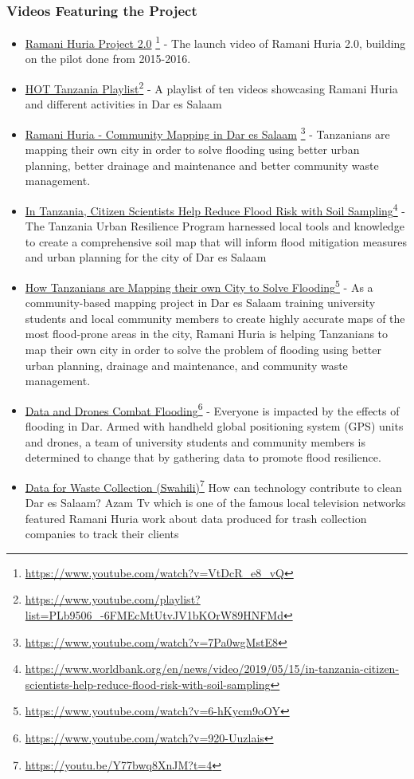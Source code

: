 \documentclass[a4paper,12pt,twoside]{article}
\begin{document}
\subsubsection{Videos Featuring the Project}
\bigskip
\begin{itemize}
    \item \href{https://www.youtube.com/watch?v=VtDcR_e8_vQ}{Ramani Huria Project 2.0} \footnote{\url{https://www.youtube.com/watch?v=VtDcR_e8_vQ}}
- The launch video of Ramani Huria 2.0, building on the pilot done from 2015-2016.
    \item \href{https://www.youtube.com/playlist?list=PLb9506_-6FMEcMtUtvJV1bKOrW89HNFMd}{HOT Tanzania Playlist}\footnote{\url{https://www.youtube.com/playlist?list=PLb9506_-6FMEcMtUtvJV1bKOrW89HNFMd}}
- A playlist of ten videos showcasing Ramani Huria and different activities in Dar es Salaam
    \item \href{https://www.youtube.com/watch?v=7Pa0wgMstE8}{Ramani Huria - Community Mapping in Dar es Salaam} \footnote{\url{https://www.youtube.com/watch?v=7Pa0wgMstE8}} - Tanzanians are mapping their own city in order to solve flooding using better urban planning, better drainage and maintenance and better community waste management.
    \item \href{https://www.worldbank.org/en/news/video/2019/05/15/in-tanzania-citizen-scientists-help-reduce-flood-risk-with-soil-sampling}{In Tanzania, Citizen Scientists Help Reduce Flood Risk with Soil Sampling}\footnote{\url{https://www.worldbank.org/en/news/video/2019/05/15/in-tanzania-citizen-scientists-help-reduce-flood-risk-with-soil-sampling}}
- The Tanzania Urban Resilience Program harnessed local tools and knowledge to create a comprehensive soil map that will inform flood mitigation measures and urban planning for the city of Dar es Salaam
    \item \href{https://www.youtube.com/watch?v=6-hKycm9oOY}{How Tanzanians are Mapping their own City to Solve Flooding}\footnote{\url{https://www.youtube.com/watch?v=6-hKycm9oOY}}
- As a community-based mapping project in Dar es Salaam training university students and local community members to create highly accurate maps of the most flood-prone areas in the city, Ramani Huria is helping Tanzanians to map their own city in order to solve the problem of flooding using better urban planning, drainage and maintenance, and community waste management.
    \item \href{https://www.youtube.com/watch?v=920-Uuzlais}{Data and Drones Combat Flooding}\footnote{\url{https://www.youtube.com/watch?v=920-Uuzlais}}
- Everyone is impacted by the effects of flooding in Dar. Armed with handheld global positioning system (GPS) units and drones, a team of university students and community members is determined to change that by gathering data to promote flood resilience.
    \item \href{https://youtu.be/Y77bwq8XnJM?t=4}{ Data for Waste Collection (Swahili)}\footnote{\url{https://youtu.be/Y77bwq8XnJM?t=4}}
How can technology contribute to clean Dar es Salaam? Azam Tv which is one of the famous local television networks featured Ramani Huria work about data produced for trash collection companies to track their clients
\end{itemize}
\end{document}
